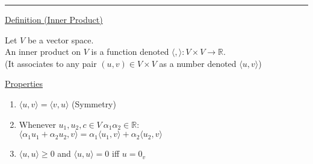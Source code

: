 \documentclass[12pt]{article}
\newcommand{\real}[0]{\mathbb{R}}
\newenvironment{block}[1][Label]{\underline{#1}\par}{}
\newcommand{\ang}[1]{\langle#1\rangle}
\newcommand{\divider}[0]{\par\textcolor{lightgray}{\rule{\textwidth}{0.1pt}}}
\begin{document}
	\divider
	
	\begin{block}[Definition (Inner Product)]
		Let $V$ be a vector space. \\
		An inner product on $V$ is a function denoted $\ang{,}: V \times V \rightarrow \real$. \\
		(It associates to any pair $(u, v) \in V \times V$ as a number denoted $\ang{u, v}$)
		
		\begin{block}[Properties]
			\begin{enumerate}
				\item $\ang{u, v} = \ang{v, u}$ \quad (Symmetry)
				\item Whenever $u_1, u_2, c \in V \ \alpha_1 \alpha_2 \in \real$: \\
				$\ang{\alpha_1 u_1 + \alpha_2 u_2, v} = \alpha_1 \ang{u_1, v} + \alpha_2 \ang{u_2, v}$
				\item $\ang{u, u} \ge 0$ and $\ang{u, u} = 0$ iff $u = 0_v$
			\end{enumerate}
		\end{block}
	\end{block}
\end{document}
